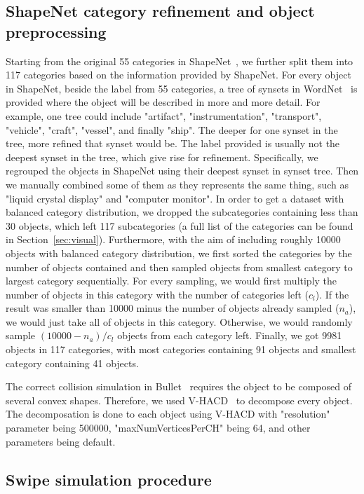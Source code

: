 \subsection{ShapeNet category refinement and object preprocessing}

Starting from the original 55 categories in ShapeNet~\cite{Chang2015}, we further split them into 117 categories based on the information provided by ShapeNet.
For every object in ShapeNet, beside the label from 55 categories, a tree of synsets in WordNet~\cite{miller1995wordnet} is provided where the object will be described in more and more detail. 
For example, one tree could include "artifact", "instrumentation", "transport", "vehicle", "craft", "vessel", and finally "ship". 
The deeper for one synset in the tree, more refined that synset would be. 
The label provided is usually not the deepest synset in the tree, which give rise for refinement. 
Specifically, we regrouped the objects in ShapeNet using their deepest synset in synset tree.
Then we manually combined some of them as they represents the same thing, such as "liquid crystal display" and "computer monitor".
In order to get a dataset with balanced category distribution, we dropped the subcategories containing less than 30 objects, which left 117 subcategories (a full list of the categories can be found in Section~\ref{sec:visual}).
Furthermore, with the aim of including roughly 10000 objects with balanced category distribution, we first sorted the categories by the number of objects contained and then sampled objects from smallest category to largest category sequentially. 
For every sampling, we would first multiply the number of objects in this category with the number of categories left ($c_l$). 
If the result was smaller than 10000 minus the number of objects already sampled ($n_a$), we would just take all of objects in this category.
Otherwise, we would randomly sample $(10000 - n_a)/c_l$ objects from each category left.
Finally, we got 9981 objects in 117 categories, with most categories containing 91 objects and smallest category containing 41 objects.

The correct collision simulation in Bullet~\cite{wiki:bullet} requires the object to be composed of several convex shapes.
Therefore, we used V-HACD~\cite{mamou2009simple} to decompose every object.
The decomposation is done to each object using V-HACD with "resolution" parameter being 500000, "maxNumVerticesPerCH" being 64, and other parameters being default.

\subsection{Swipe simulation procedure}

